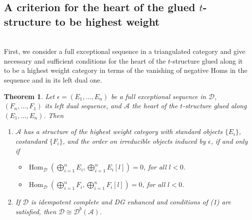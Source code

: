 \documentclass[12pt,a4paper]{amsart}
\newcommand{\aA}{{\mathcal{A}}}
\newcommand{\dD}{{\mathcal{D}}}
\newcommand{\kk}{\mathbbm{k}}
\newcommand{\tr}{{\mbox{$t$-struc}\-tu\-r}}
\newcommand{\Hom}{\mathop{\textrm{Hom}}\nolimits}
\newtheorem{THM}[LEM]{Theorem}
\theoremstyle{definition}
\begin{document}
\vspace{0.3cm}
\subsection{A criterion for the heart of the glued \tr e to be highest weight}~\\

First, we consider a full exceptional sequence in a triangulated category and give necessary and sufficient conditions for the heart of the \tr e glued along it to be a highest weight category in terms of the vanishing of negative Homs in the sequence and in its left dual one.



\begin{THM}\label{thm_univ_ext_tilt_gen}
	Let $\epsilon =(E_1,\ldots,E_n)$ be a full exceptional sequence in  $\dD$, $(F_n,\ldots,F_1)$ its left dual sequence, and $\aA$ the heart of the \tr e glued along $(E_1,\dots ,E_n)$.
	Then
	\begin{enumerate}
		\item $\aA$ has a structure of the highest weight category with standard objects $\{E_i\}$, costandard $\{F_i\}$, and the order on irreducible objects induced by $\epsilon$,
		if and only if 
		\begin{itemize}
		\item
		$\Hom_{\dD}(\bigoplus_{i=1}^n E_i, \bigoplus_{i=1}^n E_i[l])=0$, for all $l<0$.
		\item
		$\Hom_{\dD}(\bigoplus_{i=1}^n F_i, \bigoplus_{i=1}^n F_i[l])=0$, for all $l<0$. 
		\end{itemize}
		\item If $\dD$ is idempotent complete and DG enhanced \cite{BK} and conditions of (1) are satisfied, then $\dD\cong \dD^b(\aA)$.
	\end{enumerate}
\end{THM}
\end{document}
